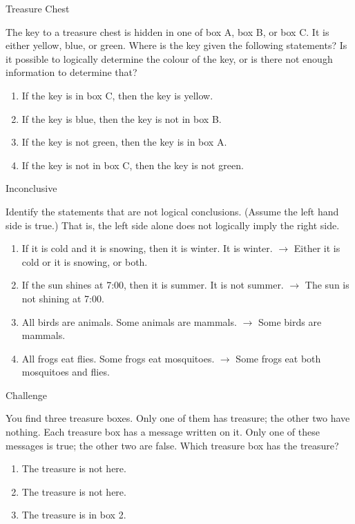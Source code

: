 \documentclass[12pt,letterpaper]{article}
\begin{document}
\begin{problem}{Treasure Chest}

The key to a treasure chest is hidden in one of box A, box B, or box C. It is
either yellow, blue, or green. Where is the key given the following statements?
Is it possible to logically determine the colour of the key, or is there not
enough information to determine that?

 \begin{enumerate}
  \item If the key is in box C, then the key is yellow.
  \item If the key is blue, then the key is not in box B.
  \item If the key is not green, then the key is in box A.
  \item If the key is not in box C, then the key is not green.
 \end{enumerate}
\end{problem}

\begin{problem}{Inconclusive}

 Identify the statements that are not logical conclusions. (Assume the left hand
 side is true.) That is, the left side alone does not logically imply the right
 side.

 \begin{enumerate}[\hspace{.5cm}a.]
  \item If it is cold and it is snowing, then it is winter. It is winter. $\to$
  Either it is cold or it is snowing, or both.
  \item If the sun shines at 7:00, then it is summer. It is not summer. $\to$
  The sun is not shining at 7:00.
  \item All birds are animals. Some animals are mammals. $\to$ Some birds are
  mammals.
  \item All frogs eat flies. Some frogs eat mosquitoes. $\to$ Some frogs eat
  both mosquitoes and flies.
 \end{enumerate}

\end{problem}


\begin{problem}{Challenge}

You find three treasure boxes. Only one of them has treasure; the other two have
nothing. Each treasure box has a message written on it. Only one of these
messages is true; the other two are false. Which treasure box has the treasure?

\begin{enumerate}
\item The treasure is not here.
\item The treasure is not here.
\item The treasure is in box 2.
\end{enumerate}
\end{problem}
\end{document}
